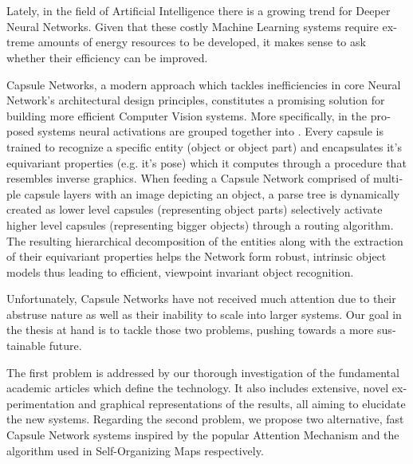 \chapter*{}
\begin{otherlanguage}{english}
	
Lately, in the field of Artificial Intelligence there is a growing trend for Deeper Neural Networks. Given that these costly Machine Learning systems require extreme amounts of energy resources to be developed, it makes sense to ask whether their efficiency can be improved.\par

Capsule Networks, a modern approach which tackles inefficiencies in core Neural Network's architectural design principles, constitutes a promising solution for building more efficient Computer Vision systems. More specifically, in the proposed systems neural activations are grouped together into . Every capsule is trained to recognize a specific entity (object or object part) and encapsulates it's equivariant properties (e.g. it's pose) which it computes through a procedure that resembles inverse graphics. When feeding a Capsule Network comprised of multiple capsule layers with an image depicting an object, a parse tree is dynamically created as lower level capsules (representing object parts) selectively activate higher level capsules (representing bigger objects) through a routing algorithm. The resulting hierarchical decomposition of the entities along with the extraction of their equivariant properties helps the Network form robust, intrinsic object models thus leading to efficient, viewpoint invariant object recognition.\par

Unfortunately, Capsule Networks have not received much attention due to their abstruse nature as well as their inability to scale into larger systems. Our goal in the thesis at hand is to tackle those two problems, pushing towards a more sustainable future.\par

The first problem is addressed by our thorough investigation of the fundamental academic articles which define the technology. It also includes extensive, novel experimentation and graphical representations of the results, all aiming to elucidate the new systems. Regarding the second problem, we propose two alternative, fast Capsule Network systems inspired by the popular Attention Mechanism and the algorithm used in Self-Organizing Maps respectively.\par


\end{otherlanguage}

